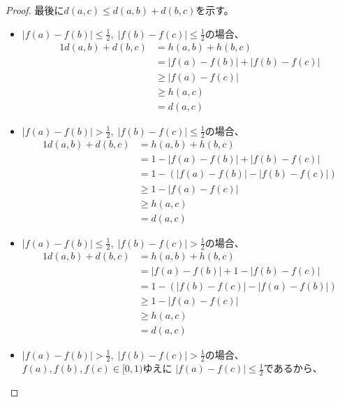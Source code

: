\documentclass[report]{jlreq}
\begin{document}
\begin{proof}
    最後に$d(a, c) \le d(a, b) + d(b, c)$を示す。
    \begin{itemize}
        \item $| f(a) - f(b) | \le \frac{1}{2}, \;
            | f(b) - f(c) | \le \frac{1}{2}$の場合、
            \begin{alignat}{1}
                d(a, b) + d(b, c)
                    &= h(a, b) + h(b, c) \\
                    &= |f(a) - f(b)| + |f(b) - f(c)| \\
                    &\ge |f(a) - f(c)| \\
                    &\ge h(a, c) \\
                    &= d(a, c)
            \end{alignat}
        \item  $| f(a) - f(b) | > \frac{1}{2}, \;
            | f(b) - f(c) | \le \frac{1}{2}$の場合、
            \begin{alignat}{1}
                d(a, b) + d(b, c)
                    &= h(a, b) + h(b, c) \\
                    &= 1 - |f(a) - f(b)| + |f(b) - f(c)| \\
                    &= 1 - (|f(a) - f(b)| - |f(b) - f(c)|) \\
                    &\ge 1 - |f(a) - f(c)| \\
                    &\ge h(a, c) \\
                    &= d(a, c)
            \end{alignat}
        \item $| f(a) - f(b) | \le \frac{1}{2}, \;
            | f(b) - f(c) | > \frac{1}{2}$の場合、
            \begin{alignat}{1}
                d(a, b) + d(b, c)
                    &= h(a, b) + h(b, c) \\
                    &= |f(a) - f(b)| + 1 - |f(b) - f(c)| \\
                    &= 1 - (|f(b) - f(c)| - |f(a) - f(b)|) \\
                    &\ge 1 - |f(a) - f(c)| \\
                    &\ge h(a, c) \\
                    &= d(a, c)
            \end{alignat}
        \item $| f(a) - f(b) | > \frac{1}{2}, \;
            | f(b) - f(c) | > \frac{1}{2}$の場合、
            $f(a), f(b), f(c) \in [0, 1)$ゆえに
            $|f(a) - f(c)| \le \frac{1}{2}$であるから、

\end{itemize}
\end{proof}
\end{document}
